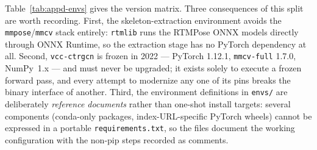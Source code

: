 \begin{table}[htbp]
\centering
\caption{Version matrix of the three conda environments. Each environment owns
one pipeline stage; cached feature files on disk are the only interface between
them. The \texttt{vcc-ctrgcn} environment is a deliberate legacy silo: its 2022
PyTorch exists solely to run the frozen CTR-GCN forward pass.}
\label{tab:appd-envs}
\end{table}

Table~\ref{tab:appd-envs} gives the version matrix. Three consequences of this
split are worth recording. First, the skeleton-extraction environment avoids
the \texttt{mmpose}/\texttt{mmcv} stack entirely: \texttt{rtmlib} runs the
RTMPose ONNX models directly through ONNX Runtime, so the extraction stage has
no PyTorch dependency at all. Second, \texttt{vcc-ctrgcn} is frozen in 2022 ---
PyTorch 1.12.1, \texttt{mmcv-full} 1.7.0, NumPy~1.x --- and must never be
upgraded; it exists solely to execute a frozen forward pass, and every attempt
to modernize any one of its pins breaks the binary interface of another.
Third, the environment definitions in \texttt{envs/} are deliberately
\emph{reference documents} rather than one-shot install targets: several
components (conda-only packages, index-URL-specific PyTorch wheels) cannot be
expressed in a portable \texttt{requirements.txt}, so the files document the
working configuration with the non-pip steps recorded as comments.


